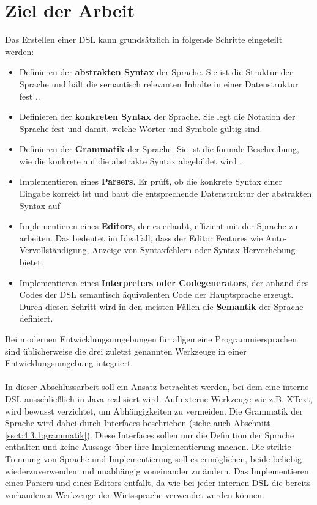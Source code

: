 \section{Ziel der Arbeit}\label{sct:2.4:ziel}
Das Erstellen einer DSL kann grundsätzlich in folgende Schritte eingeteilt werden:
\begin{itemize}
	\item Definieren der \textbf{abstrakten Syntax} der Sprache. Sie ist die Struktur der Sprache und hält die semantisch relevanten Inhalte in einer Datenstruktur fest \cite{www:heise},\cite{vl:drachen:teil3}.
	\item Definieren der \textbf{konkreten Syntax} der Sprache. Sie legt die Notation der Sprache fest und damit, welche Wörter und Symbole gültig sind\cite{vl:drachen:teil3}.
	\item Definieren der \textbf{Grammatik} der Sprache. Sie ist die formale Beschreibung, wie die konkrete auf die abstrakte Syntax abgebildet wird \cite{www:heise}.
	\item Implementieren eines \textbf{Parsers}. Er prüft, ob die konkrete Syntax einer Eingabe korrekt ist und baut die entsprechende Datenstruktur der abstrakten Syntax auf \cite{vl:drachen:teil3} 
	\item Implementieren eines \textbf{Editors}, der es erlaubt, effizient mit der Sprache zu arbeiten. Das bedeutet im Idealfall, dass der Editor Features wie Auto-Vervollständigung, Anzeige von Syntaxfehlern oder Syntax-Hervorhebung bietet.
	\item Implementieren eines \textbf{Interpreters oder Codegenerators}, der anhand des Codes der DSL semantisch äquivalenten Code der Hauptsprache erzeugt. Durch diesen Schritt wird in den meisten Fällen die \textbf{Semantik} der Sprache definiert.
\end{itemize}
Bei modernen Entwicklungsumgebungen für allgemeine Programmiersprachen sind üblicherweise die drei zuletzt genannten Werkzeuge in einer Entwicklungsumgebung integriert.
\\ \\ %
In dieser Abschlussarbeit soll ein Ansatz betrachtet werden, bei dem eine interne DSL ausschließlich in Java realisiert wird. Auf externe Werkzeuge wie z.B. XText, wird bewusst verzichtet, um Abhängigkeiten zu vermeiden. Die Grammatik der Sprache wird dabei durch Interfaces beschrieben (siehe auch Abschnitt \ref{ssct:4.3.1:grammatik}). Diese Interfaces sollen nur die Definition der Sprache enthalten und keine Aussage über ihre Implementierung machen. Die strikte Trennung von Sprache und Implementierung soll es ermöglichen, beide beliebig wiederzuverwenden und unabhängig voneinander zu ändern.
Das Implementieren eines Parsers und eines Editors entfällt, da wie bei jeder internen DSL die bereits vorhandenen Werkzeuge der Wirtssprache verwendet werden können.

